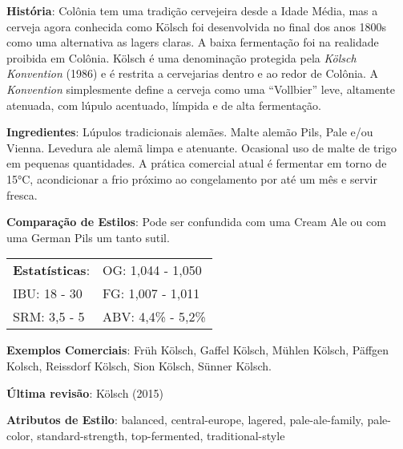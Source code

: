 \textbf{História}: Colônia tem uma tradição cervejeira desde a Idade Média, mas a cerveja agora conhecida como Kölsch foi desenvolvida no final dos anos 1800s como uma alternativa as lagers claras. A baixa fermentação foi na realidade proibida em Colônia. Kölsch é uma denominação protegida pela \textit{Kölsch Konvention} (1986) e é restrita a cervejarias dentro e ao redor de Colônia. A \textit{Konvention} simplesmente define a cerveja como uma “Vollbier” leve, altamente atenuada, com lúpulo acentuado, límpida e de alta fermentação.

\textbf{Ingredientes}: Lúpulos tradicionais alemães. Malte alemão Pils, Pale e/ou Vienna. Levedura ale alemã limpa e atenuante. Ocasional uso de malte de trigo em pequenas quantidades. A prática comercial atual é fermentar em torno de 15°C, acondicionar a frio próximo ao congelamento por até um mês e servir fresca.

\textbf{Comparação de Estilos}: Pode ser confundida com uma Cream Ale ou com uma German Pils um tanto sutil.

\begin{tabular}{@{}p{35mm}p{35mm}@{}}
  \textbf{Estatísticas}: & OG: 1,044 - 1,050 \\
  IBU: 18 - 30  & FG: 1,007 - 1,011  \\
  SRM: 3,5 - 5  & ABV: 4,4\% - 5,2\%
\end{tabular}

\textbf{Exemplos Comerciais}: Früh Kölsch, Gaffel Kölsch, Mühlen Kölsch, Päffgen Kolsch, Reissdorf Kölsch, Sion Kölsch, Sünner Kölsch.

\textbf{Última revisão}: Kölsch (2015)

\textbf{Atributos de Estilo}: balanced, central-europe, lagered, pale-ale-family, pale-color, standard-strength, top-fermented, traditional-style
